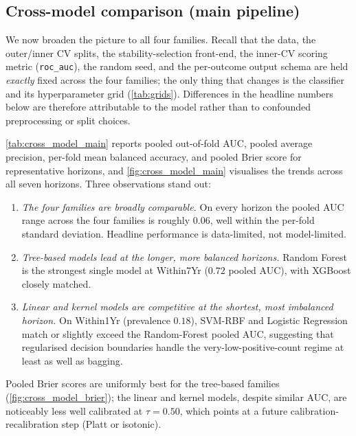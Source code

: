 \documentclass[11pt,a4paper]{article}
\providecommand{\Cref}[1]{\autoref{#1}}
\begin{document}
\subsection{Cross-model comparison (main pipeline)}
\label{sec:cross_model_compare}

We now broaden the picture to all four families. Recall that the data,
the outer/inner CV splits, the stability-selection front-end, the inner-CV
scoring metric (\texttt{roc\_auc}), the random seed, and the per-outcome
output schema are held \emph{exactly} fixed across the four families;
the only thing that changes is the classifier and its hyperparameter
grid (\Cref{tab:grids}). Differences in the headline numbers below are
therefore attributable to the model rather than to confounded
preprocessing or split choices.

\Cref{tab:cross_model_main} reports pooled out-of-fold AUC, pooled
average precision, per-fold mean balanced accuracy, and pooled Brier
score for representative horizons, and \Cref{fig:cross_model_main}
visualises the trends across all seven horizons. Three observations
stand out:
\begin{enumerate}[leftmargin=*]
  \item \emph{The four families are broadly comparable.} On every
    horizon the pooled AUC range across the four families is roughly
    $0.06$, well within the per-fold standard deviation. Headline
    performance is data-limited, not model-limited.
  \item \emph{Tree-based models lead at the longer, more balanced
    horizons.} Random Forest is the strongest single model at
    Within7Yr ($0.72$ pooled AUC), with XGBoost closely matched.
  \item \emph{Linear and kernel models are competitive at the shortest,
    most imbalanced horizon.} On Within1Yr (prevalence $0.18$),
    SVM-RBF and Logistic Regression match or slightly exceed the
    Random-Forest pooled AUC, suggesting that regularised decision
    boundaries handle the very-low-positive-count regime at least as
    well as bagging.
\end{enumerate}
Pooled Brier scores are uniformly best for the tree-based families
(\Cref{fig:cross_model_brier}); the linear and kernel models, despite
similar AUC, are noticeably less well calibrated at $\tau=0.50$, which
points at a future calibration-recalibration step (Platt or isotonic).
\end{document}
